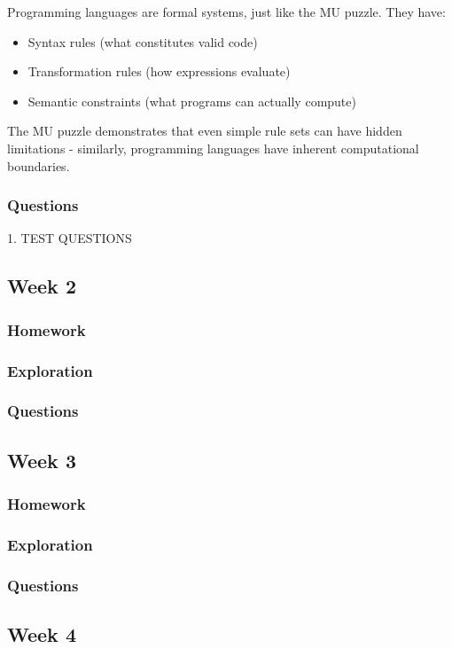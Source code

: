 \documentclass{article}
\theoremstyle{theorem}
\theoremstyle{definition}
\theoremstyle{remark}
\begin{document}
Programming languages are formal systems, just like the MU puzzle. They have:

\begin{itemize}
\item Syntax rules (what constitutes valid code)
\item Transformation rules (how expressions evaluate)  
\item Semantic constraints (what programs can actually compute)
\end{itemize}

The MU puzzle demonstrates that even simple rule sets can have hidden limitations - similarly, programming languages have inherent computational boundaries.

\subsubsection{Questions}
1. TEST QUESTIONS

\subsection{Week 2}
\subsubsection{Homework}
\subsubsection{Exploration}
\subsubsection{Questions}

\subsection{Week 3}
\subsubsection{Homework}
\subsubsection{Exploration}
\subsubsection{Questions}

\subsection{Week 4}
\end{document}
